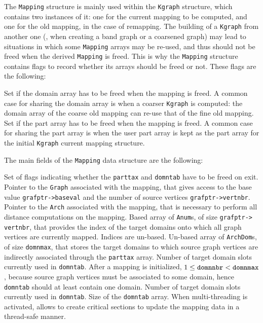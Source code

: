 The \texttt{Mapping} structure is mainly used within the
\texttt{Kgraph} structure, which contains two instances of it: one for
the current mapping to be computed, and one for the old mapping, in
the case of remapping. The building of a \texttt{Kgraph} from another
one (\eg, when creating a band graph or a coarsened graph) may lead to
situations in which some \texttt{Mapping} arrays may be re-used, and
thus should not be freed when the derived \texttt{Mapping} is
freed. This is why the \texttt{Mapping} structure contains flags to
record whether its arrays should be freed or not. These flags are the
following:
\begin{itemize}
  Set if the domain array has to be freed when the mapping is freed. A
  common case for sharing the domain array is when a coarser
  \texttt{Kgraph} is computed: the domain array of the coarse old
  mapping can re-use that of the fine old mapping.
  Set if the part array has to be freed when the mapping is freed. A
  common case for sharing the part array is when the user part array
  is kept as the part array for the initial \texttt{Kgraph} current
  mapping structure.
\end{itemize}

The main fields of the \texttt{Mapping} data structure are the following:
\begin{itemize}
  Set of flags indicating whether the \texttt{parttax} and
  \texttt{domntab} have to be freed on exit.
  Pointer to the \texttt{Graph} associated with the mapping, that
  gives access to the base value \texttt{grafptr->\lbt baseval} and
  the number of source vertices \texttt{grafptr->\lbt vertnbr}.
  Pointer to the \texttt{Arch} associated with the mapping, that is
  necessary to perform all distance computations on the mapping.
  Based array of \texttt{Anum}s, of size \texttt{grafptr->\lbt
  vertnbr}, that provides the index of the target domains onto which
  all graph vertices are currently mapped. Indices are un-based.
  Un-based array of \texttt{ArchDom}s, of size \texttt{domnmax}, that
  stores the target domains to which source graph vertices are
  indirectly associated through the \texttt{parttax} array.
  Number of target domain slots currently used in
  \texttt{domntab}. After a mapping is initialized, $1 \leq
  \mbox{\texttt{domnnbr}} < \mbox{\texttt{domnmax}}$, because source
  graph vertices must be associated to some domain, hence
  \texttt{domntab} should at least contain one domain.
  Number of target domain slots currently used in
  \texttt{domntab}.
  Size of the \texttt{domntab} array.
  When multi-threading is activated, allows to create critical
  sections to update the mapping data in a thread-safe manner.
\end{itemize}

